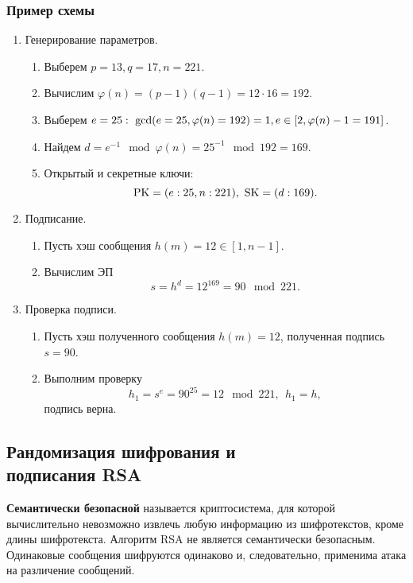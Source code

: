 \subsubsection{Пример схемы}

\begin{enumerate}
    \item Генерирование параметров.
        \begin{enumerate}
            \item Выберем $p=13, q=17, n = 221$.
            \item Вычислим $\varphi(n) = (p-1)(q-1) = 12 \cdot 16 = 192$.
            \item Выберем $e=25: ~ \gcd(e = 25, \varphi(n) = 192) = 1, \\
                e \in [2, \varphi(n) - 1 = 191]$.
            \item Найдем $d = e^{-1} \mod \varphi(n) = 25^{-1} \mod 192 = 169$.
            \item Открытый и секретные ключи:
                \[ \textrm{PK} = (e:25, n:221), ~ \textrm{SK} = (d:169). \]
        \end{enumerate}
    \item Подписание.
        \begin{enumerate}
            \item Пусть хэш сообщения $h(m) = 12 \in [1, n-1]$.
            \item Вычислим ЭП
                \[ s = h^d = 12^{169} = 90 \mod 221. \]
        \end{enumerate}
    \item Проверка подписи.
        \begin{enumerate}
            \item Пусть хэш полученного сообщения $h(m) = 12$, полученная подпись $s = 90$.
            \item Выполним проверку
                \[ h_1 = s^e = 90^{25} = 12 \mod 221, ~~ h_1 = h, \]
                подпись верна.
        \end{enumerate}
\end{enumerate}


\subsection[Рандомизация шифрования и ЭП]{Рандомизация шифрования и \protect\\ подписания RSA}

\textbf{Семантически безопасной} называется криптосистема, для которой вычислительно невозможно извлечь любую информацию из шифротекстов, кроме длины шифротекста. Алгоритм RSA не является семантически безопасным. Одинаковые сообщения шифруются одинаково и, следовательно, применима атака на различение сообщений.


